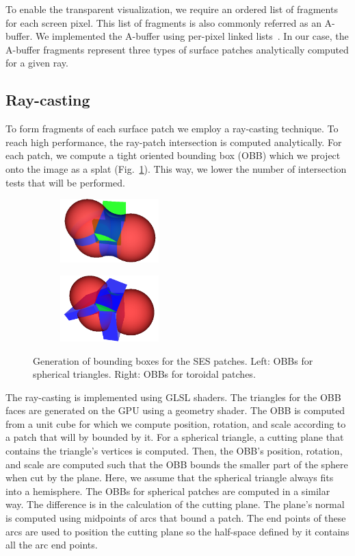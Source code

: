 \label{sec:vis}

To enable the transparent visualization, we require an ordered list of fragments for each screen pixel. 
This list of fragments is also commonly referred as an A-buffer. 
We implemented the A-buffer using per-pixel linked lists~\cite{yang2010real}. 
In our case, the A-buffer fragments represent three types of surface patches analytically computed for a given ray.

\subsection{Ray-casting}
\label{sec:spherical-patches}
To form fragments of each surface patch we employ a ray-casting technique.
To reach high performance, the ray-patch intersection is computed analytically.
For each patch, we compute a tight oriented bounding box (OBB) which we project onto the image as a splat (Fig.~\ref{fig:obb}).
This way, we lower the number of intersection tests that will be performed.

\begin{figure}[htp]
  \centering
  \begin{subfigure}[t]{0.48\columnwidth}
    \centering
    \includegraphics[width=1.5in]{image/obb-triangles.png}
  \end{subfigure}%
  \quad
  \begin{subfigure}[t]{0.48\columnwidth}
    \centering
    \includegraphics[width=1.5in]{image/obb-tori.png}
  \end{subfigure}
	\caption{Generation of bounding boxes for the SES patches.
	Left: OBBs for spherical triangles.
  Right: OBBs for toroidal patches.}
	\label{fig:obb}
\end{figure}

The ray-casting is implemented using GLSL shaders.
The triangles for the OBB faces are generated on the GPU using a geometry shader.
The OBB is computed from a unit cube for which we compute position, rotation, and scale according to a patch that will by bounded by it.
For a spherical triangle, a cutting plane that contains the triangle's vertices is computed.
Then, the OBB's position, rotation, and scale are computed such that the OBB bounds the smaller part of the sphere when cut by the plane.
Here, we assume that the spherical triangle always fits into a hemisphere.
The OBBs for spherical patches are computed in a similar way.
The difference is in the calculation of the cutting plane.
The plane's normal is computed using midpoints of arcs that bound a patch.
The end points of these arcs are used to position the cutting plane so the half-space defined by it contains all the arc end points.

